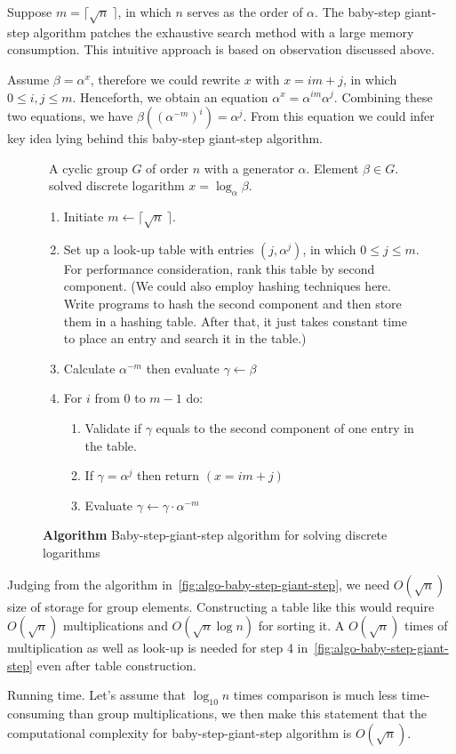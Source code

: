 \documentclass[12pt,journal,compsoc]{IEEEtran}
\begin{document}
Suppose $m=\lceil \sqrt{n}~\rceil$, in which $n$ serves as the order
of $\alpha$. The baby-step giant-step algorithm patches the exhaustive
search method with a large memory consumption. This intuitive approach
is based on observation discussed above.
\par
Assume $\beta=\alpha^{x}$, therefore we could rewrite $x$ with
$x=im+j$, in which $0\leq i,j\leq m$. Henceforth, we obtain an
equation $\alpha^{x}=\alpha^{im}\alpha^{j}$. Combining these two
equations, we have $\beta{({(\alpha^{-m})}^{i})=\alpha^{j}}$. From
this equation we could infer key idea lying behind this baby-step
giant-step algorithm.
\begin{figure}[!htbp]
  \centering
  \begin{algorithmic}
    \REQUIRE~A cyclic group $G$ of order $n$ with a generator
    $\alpha$. Element $\beta\in G$. 
    \ENSURE~solved discrete logarithm $x=\log_{\alpha}\beta$.
    \begin{enumerate}
    \item Initiate $m\leftarrow \lceil \sqrt{n}~\rceil$.
    \item Set up a look-up table with entries $(j,\alpha^{j})$, in
      which $0\leq j\leq m$. For performance consideration, rank this
      table by second component. (We could also employ hashing
      techniques here. Write programs to hash the second component and
      then store them in a hashing table. After that, it just takes
      constant time to place an entry and search it in the table.)
    \item Calculate $\alpha^{-m}$ then evaluate
      $\gamma\leftarrow\beta$
    \item For $i$ from $0$ to $m-1$ do:
      \begin{enumerate}
      \item Validate if $\gamma$ equals to the second component of one
        entry in the table.
      \item If $\gamma=\alpha^{j}$ then return $(x=im+j)$
      \item Evaluate $\gamma\leftarrow\gamma\cdot\alpha^{-m}$
      \end{enumerate}
    \end{enumerate}
  \end{algorithmic}
  \caption{\textbf{Algorithm} Baby-step-giant-step algorithm for solving discrete logarithms}
  \label{fig:algo-baby-step-giant-step}
\end{figure}
\par
Judging from the algorithm in~\autoref{fig:algo-baby-step-giant-step},
we need $O(\sqrt{n})$ size of storage for group elements. Constructing
a table like this would require $O(\sqrt{n})$ multiplications and
$O(\sqrt{n}\log n)$ for sorting it. A $O(\sqrt{n})$ times of
multiplication as well as look-up is needed for step 4
in~\autoref{fig:algo-baby-step-giant-step} even after table
construction.
\par
Running time. Let's assume that $\log_{10} n$ times comparison is much less
time-consuming than group multiplications, we then make this statement
that the computational complexity for baby-step-giant-step algorithm
is $O(\sqrt{n})$.
\end{document}
